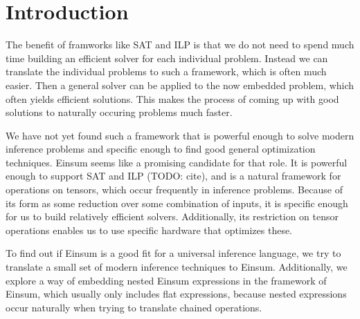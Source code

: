 \chapter{Introduction}


The benefit of framworks like SAT and ILP is that we do not need to spend much time building an efficient solver for each individual problem.
Instead we can translate the individual problems to such a framework, which is often much easier.
Then a general solver can be applied to the now embedded problem, which often yields efficient solutions.
This makes the process of coming up with good solutions to naturally occuring problems much faster.

We have not yet found such a framework that is powerful enough to solve modern inference problems
and specific enough to find good general optimization techniques.
Einsum seems like a promising candidate for that role.
It is powerful enough to support SAT and ILP (TODO: cite), and is a natural framework for operations on tensors, which occur frequently in inference problems.
Because of its form as some reduction over some combination of inputs, it is specific enough for us to build relatively efficient solvers.
Additionally, its restriction on tensor operations enables us to use specific hardware that optimizes these.

To find out if Einsum is a good fit for a universal inference language,
we try to translate a small set of modern inference techniques to Einsum.
Additionally, we explore a way of embedding nested Einsum expressions in the framework of Einsum,
which usually only includes flat expressions,
because nested expressions occur naturally when trying to translate chained operations.